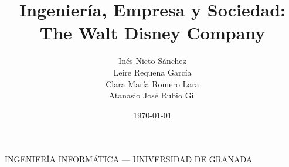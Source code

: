 \documentclass[12pt, spanish]{article}
\title{%
	Ingeniería, Empresa y Sociedad: \\
	The Walt Disney Company
	\hspace{0.05cm}
}
\author{
	Inés Nieto Sánchez \\
	Leire Requena García \\
	Clara María Romero Lara \\
	Atanasio José Rubio Gil
}
\date{\today}
\makeatletter
\let\thetitle\@title
\let\theauthor\@author
\let\thedate\@date
\makeatother
\begin{document}

\begin{titlepage}
	\singlespacing%
	\begin{center}
		\vspace*{8cm}
		\textsc{INGENIERÍA INFORMÁTICA --- UNIVERSIDAD DE GRANADA} \\
		{\huge\bfseries\thetitle}\\[8cm]
	\end{center}

	\begin{flushright}
		\large\theauthor\\[0.973cm]
	\end{flushright}

	\begin{center}
		\large\thedate%
	\end{center}
\end{titlepage}


\tableofcontents
\pagebreak



\pagebreak


\pagebreak


	
	
	
	
	
\pagebreak


	
	
	
	
	
\pagebreak


	
	
\pagebreak


	
	
	
		
		
	
		
		
	
		
		
		
	
		
		
	
			
	
\pagebreak


	
	
\pagebreak


\end{document}
